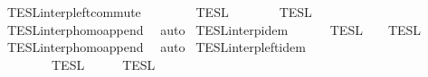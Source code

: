 \begin{isabellebody}
\ TESL{\isacharunderscore}interp{\isacharunderscore}left{\isacharunderscore}commute{\isacharcolon}\isanewline
\ \ {\isacartoucheopen}{\isasymlbrakk}{\isasymlbrakk}\ {\isasymPhi}\ {\isacharat}\ {\isacharparenleft}{\isasymPhi}\ {\isacharat}\ {\isasymPhi}\ {\isasymrbrakk}{\isasymrbrakk}\isactrlsub T\isactrlsub E\isactrlsub S\isactrlsub L\ {\isacharequal}\ {\isasymlbrakk}{\isasymlbrakk}\ {\isasymPhi}\ {\isacharat}\ {\isacharparenleft}{\isasymPhi}\ {\isacharat}\ {\isasymPhi}\ {\isasymrbrakk}{\isasymrbrakk}\isactrlsub T\isactrlsub E\isactrlsub S\isactrlsub L{\isacartoucheclose}\isanewline
%
\isadelimproof
%
\endisadelimproof
%
\isatagproof
{}\isamarkupfalse%
\ TESL{\isacharunderscore}interp{\isacharunderscore}homo{\isacharunderscore}append\ \isamarkupfalse%
\ auto%
\endisatagproof
{\isafoldproof}%
%
\isadelimproof
\isanewline
%
\endisadelimproof
\isanewline
{}\isamarkupfalse%
\ TESL{\isacharunderscore}interp{\isacharunderscore}idem{\isacharcolon}\isanewline
\ \ {\isacartoucheopen}{\isasymlbrakk}{\isasymlbrakk}\ {\isasymPhi}\ {\isacharat}\ {\isasymPhi}\ {\isasymrbrakk}{\isasymrbrakk}\isactrlsub T\isactrlsub E\isactrlsub S\isactrlsub L\ {\isacharequal}\ {\isasymlbrakk}{\isasymlbrakk}\ {\isasymPhi}\ {\isasymrbrakk}{\isasymrbrakk}\isactrlsub T\isactrlsub E\isactrlsub S\isactrlsub L{\isacartoucheclose}\isanewline
%
\isadelimproof
%
\endisadelimproof
%
\isatagproof
{}\isamarkupfalse%
\ TESL{\isacharunderscore}interp{\isacharunderscore}homo{\isacharunderscore}append\ \isamarkupfalse%
\ auto%
\endisatagproof
{\isafoldproof}%
%
\isadelimproof
\isanewline
%
\endisadelimproof
\isanewline
{}\isamarkupfalse%
\ TESL{\isacharunderscore}interp{\isacharunderscore}left{\isacharunderscore}idem{\isacharcolon}\isanewline
\ \ {\isacartoucheopen}{\isasymlbrakk}{\isasymlbrakk}\ {\isasymPhi}\ {\isacharat}\ {\isacharparenleft}{\isasymPhi}\ {\isacharat}\ {\isasymPhi}\ {\isasymrbrakk}{\isasymrbrakk}\isactrlsub T\isactrlsub E\isactrlsub S\isactrlsub L\ {\isacharequal}\ {\isasymlbrakk}{\isasymlbrakk}\ {\isasymPhi}\ {\isacharat}\ {\isasymPhi}\ {\isasymrbrakk}{\isasymrbrakk}\isactrlsub T\isactrlsub E\isactrlsub S\isactrlsub L{\isacartoucheclose}\isanewline

\end{isabellebody}
